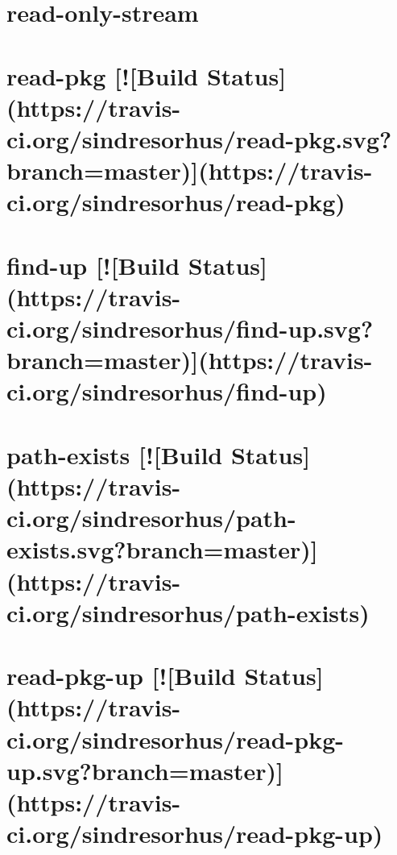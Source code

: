 \documentclass[twoside]{book}
\newcommand{\+}{\discretionary{\mbox{\scriptsize$\hookleftarrow$}}{}{}}
\begin{document}
\chapter{read-\/only-\/stream}
\label{md_dsmacc_examples_DRmerge_node_modules_read-only-stream_readme}

\chapter{read-\/pkg \mbox{[}!\mbox{[}Build Status\mbox{]}(https\+://travis-\/ci.org/sindresorhus/read-\/pkg.svg?branch=master)\mbox{]}(https\+://travis-\/ci.org/sindresorhus/read-\/pkg)}
\label{md_dsmacc_examples_DRmerge_node_modules_read-pkg_readme}

\chapter{find-\/up \mbox{[}!\mbox{[}Build Status\mbox{]}(https\+://travis-\/ci.org/sindresorhus/find-\/up.svg?branch=master)\mbox{]}(https\+://travis-\/ci.org/sindresorhus/find-\/up)}
\label{md_dsmacc_examples_DRmerge_node_modules_read-pkg-up_node_modules_find-up_readme}

\chapter{path-\/exists \mbox{[}!\mbox{[}Build Status\mbox{]}(https\+://travis-\/ci.org/sindresorhus/path-\/exists.svg?branch=master)\mbox{]}(https\+://travis-\/ci.org/sindresorhus/path-\/exists)}
\label{md_dsmacc_examples_DRmerge_node_modules_read-pkg-up_node_modules_path-exists_readme}

\chapter{read-\/pkg-\/up \mbox{[}!\mbox{[}Build Status\mbox{]}(https\+://travis-\/ci.org/sindresorhus/read-\/pkg-\/up.svg?branch=master)\mbox{]}(https\+://travis-\/ci.org/sindresorhus/read-\/pkg-\/up)}
\label{md_dsmacc_examples_DRmerge_node_modules_read-pkg-up_readme}

\end{document}
